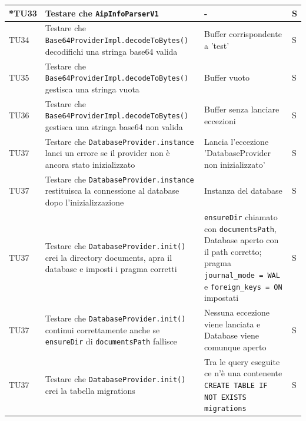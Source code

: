 \documentclass[a4paper,12pt]{article}
\begin{document}
\begin{longtable}{|M{1.2cm}|M{5cm}|M{7cm}|M{1.5cm}|}

            *TU33 & Testare che \texttt{AipInfoParserV1} & - & S \\
            \hline

            TU34 & Testare che \texttt{Base64ProviderImpl.decodeToBytes()} decodifichi una stringa base64 valida & Buffer corrispondente a 'test' & S \\
            \hline

            TU35 & Testare che \texttt{Base64ProviderImpl.decodeToBytes()} gestisca una stringa vuota & Buffer vuoto & S \\
            \hline

            TU36 & Testare che \texttt{Base64ProviderImpl.decodeToBytes()} gestisca una stringa base64 non valida & Buffer senza lanciare eccezioni & S \\
            \hline

            TU37 & Testare che \texttt{DatabaseProvider.instance} lanci un errore se il provider non è ancora stato inizializzato & Lancia l'eccezione 'DatabaseProvider non inizializzato' & S \\
            \hline

            TU37 & Testare che \texttt{DatabaseProvider.instance} restituisca la connessione al database dopo l'inizializzazione & Instanza del database & S \\
            \hline

            TU37 & Testare che \texttt{DatabaseProvider.init()} crei la directory documents, apra il database e imposti i pragma corretti & \texttt{ensureDir} chiamato con \texttt{documentsPath}, Database aperto con il path corretto; pragma \texttt{journal\_mode = WAL} e \texttt{foreign\_keys = ON} impostati & S \\
            \hline

            TU37 & Testare che \texttt{DatabaseProvider.init()} continui correttamente anche se \texttt{ensureDir} di \texttt{documentsPath} fallisce & Nessuna eccezione viene lanciata e Database viene comunque aperto & S \\
            \hline

            TU37 & Testare che \texttt{DatabaseProvider.init()} crei la tabella migrations & Tra le query eseguite ce n'è una contenente \texttt{CREATE TABLE IF NOT EXISTS migrations} & S \\
            \hline


\end{longtable}
\end{document}
